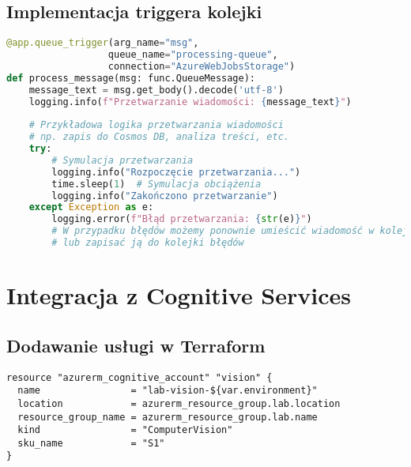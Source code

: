 \documentclass{article}
\begin{document}
\subsection{Implementacja triggera kolejki}
\begin{lstlisting}[language=python]
@app.queue_trigger(arg_name="msg", 
                  queue_name="processing-queue",
                  connection="AzureWebJobsStorage")
def process_message(msg: func.QueueMessage):
    message_text = msg.get_body().decode('utf-8')
    logging.info(f"Przetwarzanie wiadomości: {message_text}")
    
    # Przykładowa logika przetwarzania wiadomości
    # np. zapis do Cosmos DB, analiza treści, etc.
    try:
        # Symulacja przetwarzania
        logging.info("Rozpoczęcie przetwarzania...")
        time.sleep(1)  # Symulacja obciążenia
        logging.info("Zakończono przetwarzanie")
    except Exception as e:
        logging.error(f"Błąd przetwarzania: {str(e)}")
        # W przypadku błędów możemy ponownie umieścić wiadomość w kolejce
        # lub zapisać ją do kolejki błędów
\end{lstlisting}

\section{Integracja z Cognitive Services}
\subsection{Dodawanie usługi w Terraform}
\begin{lstlisting}[]
resource "azurerm_cognitive_account" "vision" {
  name                = "lab-vision-${var.environment}"
  location            = azurerm_resource_group.lab.location
  resource_group_name = azurerm_resource_group.lab.name
  kind                = "ComputerVision"
  sku_name            = "S1"
}
\end{lstlisting}
\end{document}
